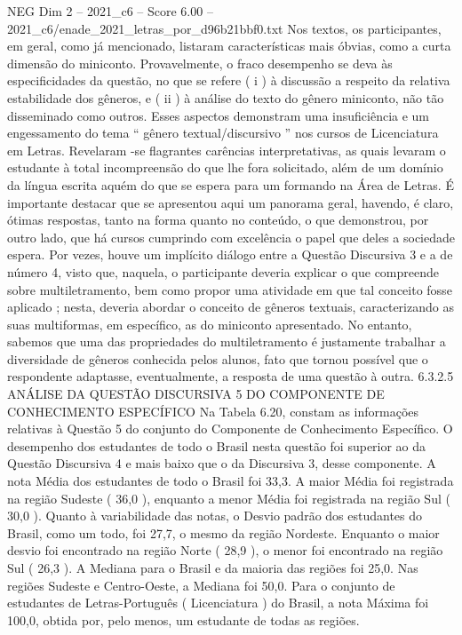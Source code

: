 \begin{textsample}{NEG Dim 2 – 2021\_c6 – Score 6.00 – 2021\_c6/enade\_2021\_letras\_por\_d96b21bbf0.txt}
Nos textos, os participantes, em geral, como já mencionado, listaram características mais óbvias, como a curta dimensão do miniconto.
Provavelmente, o fraco desempenho se deva às especificidades da questão, no que se refere ( i ) à discussão a respeito da relativa estabilidade dos gêneros, e ( ii ) à análise do texto do gênero miniconto, não tão disseminado como outros.
Esses aspectos demonstram uma insuficiência e um engessamento do tema “ gênero textual/discursivo ” nos cursos de Licenciatura em Letras.
Revelaram -se flagrantes carências interpretativas, as quais levaram o estudante à total incompreensão do que lhe fora solicitado, além de um domínio da língua escrita aquém do que se espera para um formando na Área de Letras.
É importante destacar que se apresentou aqui um panorama geral, havendo, é claro, ótimas respostas, tanto na forma quanto no conteúdo, o que demonstrou, por outro lado, que há cursos cumprindo com excelência o papel que deles a sociedade espera.
Por vezes, houve um implícito diálogo entre a Questão Discursiva 3 e a de número 4, visto que, naquela, o participante deveria explicar o que compreende sobre multiletramento, bem como propor uma atividade em que tal conceito fosse aplicado ; nesta, deveria abordar o conceito de gêneros textuais, caracterizando as suas multiformas, em específico, as do miniconto apresentado.
No entanto, sabemos que uma das propriedades do multiletramento é justamente trabalhar a diversidade de gêneros conhecida pelos alunos, fato que tornou possível que o respondente adaptasse, eventualmente, a resposta de uma questão à outra. 6.3.2.5 ANÁLISE DA QUESTÃO DISCURSIVA 5 DO COMPONENTE DE CONHECIMENTO ESPECÍFICO Na Tabela 6.20, constam as informações relativas à Questão 5 do conjunto do Componente de Conhecimento Específico.
O desempenho dos estudantes de todo o Brasil nesta questão foi superior ao da Questão Discursiva 4 e mais baixo que o da Discursiva 3, desse componente.
A nota Média dos estudantes de todo o Brasil foi 33,3.
A maior Média foi registrada na região Sudeste ( 36,0 ), enquanto a menor Média foi registrada na região Sul ( 30,0 ).
Quanto à variabilidade das notas, o Desvio padrão dos estudantes do Brasil, como um todo, foi 27,7, o mesmo da região Nordeste.
Enquanto o maior desvio foi encontrado na região Norte ( 28,9 ), o menor foi encontrado na região Sul ( 26,3 ).
A Mediana para o Brasil e da maioria das regiões foi 25,0.
Nas regiões Sudeste e Centro-Oeste, a Mediana foi 50,0.
Para o conjunto de estudantes de Letras-Português ( Licenciatura ) do Brasil, a nota Máxima foi 100,0, obtida por, pelo menos, um estudante de todas as regiões.

\end{textsample}
